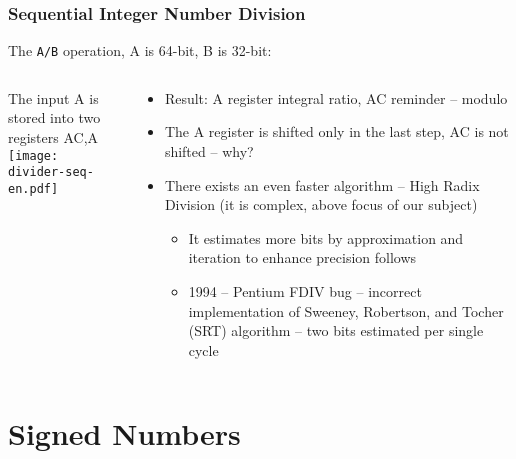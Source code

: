 \documentclass{beamer}
\begin{document}
\begin{frame}
\frametitle{Sequential Integer Number Division}

The \texttt{A/B} operation, A is 64-bit, B is 32-bit:

\begin{columns}
\begin{column}{0.45\textwidth}
The input A is stored into two registers AC,A\\
\texttt{[image: divider-seq-en.pdf]}
\end{column}
\hfill
\begin{column}{0.55\textwidth}
\begin{itemize}
\item Result: A register integral ratio, AC reminder -- modulo
\item The A register is shifted only in the last step, AC is not shifted -- why?
\item There exists an even faster algorithm -- High Radix Division (it is complex, above focus of our subject)
\begin{itemize}
\item It estimates more bits by approximation and iteration to enhance precision follows
\item 1994 -- Pentium FDIV bug -- incorrect implementation of Sweeney, Robertson, and Tocher (SRT) algorithm -- two bits estimated per single cycle
\end{itemize}
\end{itemize}
\end{column}
\end{columns}


\end{frame}


\section{Signed Numbers}
\end{document}
